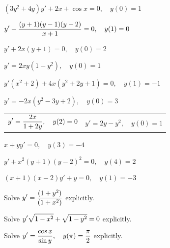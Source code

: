 \begin{exerciselist}
  \item\label{exer:2.2.13} \CGex $(3y^{2}+4y)y'+2x+\cos x=0,\quad y(0)=1$

  \item\label{exer:2.2.14} \CGex $\displaystyle{y'+\frac{(y+1)(y-1)(y-2)}{x+1}=0,\quad y(1)=0}$

  \item\label{exer:2.2.15} \CGex $y'+2x(y+1)=0,\quad y(0)=2$

  \item\label{exer:2.2.16} \CGex $y'=2xy(1+y^{2}),\quad y(0)=1$


  \item\label{exer:2.2.17} $y'(x^{2}+2)+4x(y^{2}+2y+1)=0,\quad y(1)=-1$

  \item\label{exer:2.2.18} $y'=-2x(y^{2}-3y+2),\quad y(0)=3$

  \begin{tabular}[t]{@{}p{168pt}@{}p{168pt}}
    \item\label{exer:2.2.19} $\displaystyle{y'=\frac{2x}{1+2y}, \quad y(2)=0}$ &
    \item \vspace*{5.5pt}\label{exer:2.2.20} $y'=2y-y^{2}, \quad y(0)=1$
  \end{tabular}

  \item\label{exer:2.2.21} $x+yy'=0,\quad y(3)=-4$

  \item\label{exer:2.2.22} $y'+x^{2}(y+1)(y-2)^{2}=0,\quad y(4)=2$

  \item\label{exer:2.2.23} $(x+1)(x-2)y'+y=0,\quad y(1)=-3$

  \item\label{exer:2.2.24} Solve $\displaystyle{y'=\frac{(1+y^{2})}{(1+x^{2})}}$ explicitly. 

  \item\label{exer:2.2.25} Solve $\displaystyle{y'\sqrt{1-x^{2}}+\sqrt{1-y^{2}}=0}$ explicitly. 

  \item\label{exer:2.2.26} Solve $\displaystyle{y'=\frac{\cos x}{\sin y},\quad y(\pi)=\frac{\pi}{2}}$
        explicitly. 


\end{exerciselist}
